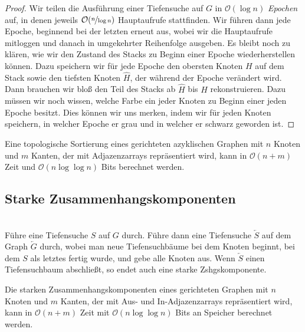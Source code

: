 \documentclass{cheat-sheet}
\renewcommand{\O}{\mathcal{O}} %
\begin{document}
\begin{proof}
  Wir teilen die Ausführung einer Tiefensuche auf $G$ in $\O(\log n)$ \textit{Epochen} auf, in denen jeweils $\O(\nicefrac{n}{\log n})$ Hauptaufrufe stattfinden.
  Wir führen dann jede Epoche, beginnend bei der letzten erneut aus, wobei wir die Hauptaufrufe mitloggen und danach in umgekehrter Reihenfolge ausgeben.
  Es bleibt noch zu klären, wie wir den Zustand des Stacks zu Beginn einer Epoche wiederherstellen können.
  Dazu speichern wir für jede Epoche den obersten Knoten $H$ auf dem Stack sowie den tiefsten Knoten $\hat{H}$, der während der Epoche verändert wird.
  Dann brauchen wir bloß den Teil des Stacks ab $\hat{H}$ bis $H$ rekonstruieren.
  Dazu müssen wir noch wissen, welche Farbe ein jeder Knoten zu Beginn einer jeden Epoche besitzt.
  Dies können wir uns merken, indem wir für jeden Knoten speichern, in welcher Epoche er grau und in welcher er schwarz geworden ist.
\end{proof}

\begin{kor}
  Eine topologische Sortierung eines gerichteten azyklischen Graphen mit $n$ Knoten und $m$ Kanten, der mit Adjazenzarrays repräsentiert wird, kann in $\O(n + m)$ Zeit und $\O(n \log \log n)$ Bits berechnet werden.
\end{kor}

\subsection{Starke Zusammenhangskomponenten}


\begin{alg} \mbox{}\\
  Führe eine Tiefensuche $S$ auf $G$ durch.
  Führe dann eine Tiefensuche $\overleftarrow{S}$ auf dem Graph $\overleftarrow{G}$ durch, wobei man neue Tiefensuchbäume bei dem Knoten beginnt, bei dem $S$ als letztes fertig wurde, und gebe alle Knoten aus.
  Wenn $\overleftarrow{S}$ einen Tiefensuchbaum abschließt, so endet auch eine starke Zshgskomponente.
\end{alg}

\begin{thm}
  Die starken Zusammenhangskomponenten eines gerichteten Graphen mit $n$ Knoten und $m$ Kanten, der mit Aus- und In-Adjazenzarrays repräsentiert wird, kann in $\O(n + m)$ Zeit mit $\O(n \log \log n)$ Bits an Speicher berechnet werden.
\end{thm}
\end{document}
